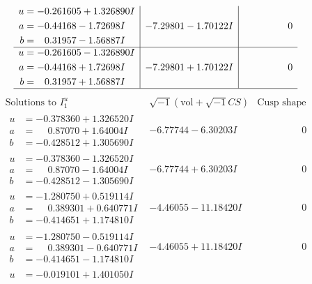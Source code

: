 \documentclass[1p]{elsarticle_modified}
\theoremstyle{definition}
\newcommand{\I}{\sqrt{-1}}
\begin{document}
$$\begin{array}{c|c|c}
\begin{aligned}
u &= -0.261605 + 1.326890 I \\
a &= -0.44168 - 1.72698 I \\
b &= \phantom{-}0.31957 - 1.56887 I\end{aligned}
 & -7.29801 - 1.70122 I & \phantom{-0.000000 } 0 \\ \hline\begin{aligned}
u &= -0.261605 - 1.326890 I \\
a &= -0.44168 + 1.72698 I \\
b &= \phantom{-}0.31957 + 1.56887 I\end{aligned}
 & -7.29801 + 1.70122 I & \phantom{-0.000000 } 0\\
 \hline 
 \end{array}$$\newpage$$\begin{array}{c|c|c}  
\text{Solutions to }I^u_{1}& \I (\text{vol} + \sqrt{-1}CS) & \text{Cusp shape}\\
 \hline 
\begin{aligned}
u &= -0.378360 + 1.326520 I \\
a &= \phantom{-}0.87070 + 1.64004 I \\
b &= -0.428512 + 1.305690 I\end{aligned}
 & -6.77744 - 6.30203 I & \phantom{-0.000000 } 0 \\ \hline\begin{aligned}
u &= -0.378360 - 1.326520 I \\
a &= \phantom{-}0.87070 - 1.64004 I \\
b &= -0.428512 - 1.305690 I\end{aligned}
 & -6.77744 + 6.30203 I & \phantom{-0.000000 } 0 \\ \hline\begin{aligned}
u &= -1.280750 + 0.519114 I \\
a &= \phantom{-}0.389301 + 0.640771 I \\
b &= -0.414651 + 1.174810 I\end{aligned}
 & -4.46055 - 11.18420 I & \phantom{-0.000000 } 0 \\ \hline\begin{aligned}
u &= -1.280750 - 0.519114 I \\
a &= \phantom{-}0.389301 - 0.640771 I \\
b &= -0.414651 - 1.174810 I\end{aligned}
 & -4.46055 + 11.18420 I & \phantom{-0.000000 } 0 \\ \hline\begin{aligned}
u &= -0.019101 + 1.401050 I \\

\end{aligned}
\end{array}$$
\end{document}
